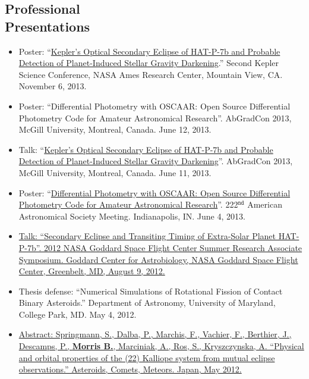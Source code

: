 \documentclass[margin]{res}
\begin{document}
\begin{resume}
\section{Professional\\ Presentations} 
                 \begin{itemize}  %
                 \item Poster: ``\href{http://nexsci.caltech.edu/conferences/KeplerII/posters/morris.pdf}{Kepler's Optical Secondary Eclipse of HAT-P-7b and Probable Detection of Planet-Induced Stellar Gravity Darkening}.'' Second Kepler Science Conference, NASA Ames Research Center, Mountain View, CA. November 6, 2013. 
                 \item Poster: ``Differential Photometry with OSCAAR: Open Source Differential Photometry Code for Amateur Astronomical Research''. AbGradCon 2013, McGill University, Montreal, Canada. June 12, 2013.
                 \item Talk: ``\href{http://youtu.be/ZMfbkCzzQUE}{Kepler's Optical Secondary Eclipse of HAT-P-7b and Probable Detection of Planet-Induced Stellar Gravity Darkening}''. AbGradCon 2013, McGill University, Montreal, Canada. June 11, 2013.
                 \item Poster: ``\href{http://adsabs.harvard.edu/abs/2013AAS...22221717M}{Differential Photometry with OSCAAR: Open Source Differential Photometry Code for Amateur Astronomical Research}''. 222$^\mathtt{nd}$ American Astronomical Society Meeting. Indianapolis, IN. June 4, 2013.
                 \item \href{https://astrobiology.nasa.gov/seminars/featured-seminar-channels/gsfc-summer-internship/2012/08/09/gsfc-summer-research-associate-presentations/}{Talk: ``Secondary Eclipse and Transiting Timing of Extra-Solar Planet HAT-P-7b''. 2012 NASA Goddard Space Flight Center Summer Research Associate Symposium. Goddard Center for Astrobiology, NASA Goddard Space Flight Center, Greenbelt, MD, August 9, 2012.}
	        \item Thesis defense:  ``Numerical Simulations of Rotational Fission of Contact Binary Asteroids.'' Department of Astronomy, University of Maryland, College Park, MD. May 4, 2012.
                 \item \href{http://adsabs.harvard.edu/abs/2012LPICo1667.6352S}{Abstract: Springmann, S., Dalba, P., Marchis, F., Vachier, F., Berthier, J., Descamps, P., \textbf{Morris B.}, 
		Marciniak, A., Ros, S., Kryszczynska, A. ``Physical and orbital properties of the (22) Kalliope system from mutual eclipse observations.'' 
		Asteroids, Comets, Meteors. Japan, May 2012.}\\
		\end{itemize}


\end{resume}
\end{document}
